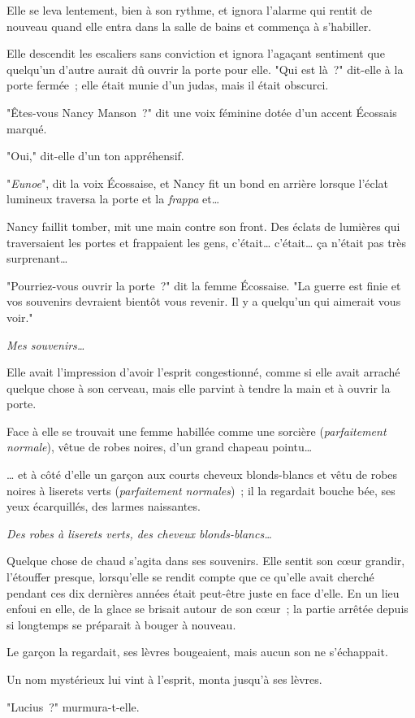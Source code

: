 Elle se leva lentement, bien à son rythme, et ignora l'alarme qui rentit de nouveau quand elle entra dans la salle de bains et commença à s'habiller.

Elle descendit les escaliers sans conviction et ignora l'agaçant sentiment que quelqu'un d'autre aurait dû ouvrir la porte pour elle. "Qui est là~?" dit-elle à la porte fermée~; elle était munie d'un judas, mais il était obscurci.

"Êtes-vous Nancy Manson~?" dit une voix féminine dotée d'un accent Écossais marqué.

"Oui," dit-elle d'un ton appréhensif.

"\emph{Eunoe}", dit la voix Écossaise, et Nancy fit un bond en arrière lorsque l'éclat lumineux traversa la porte et la \emph{frappa} et…

Nancy faillit tomber, mit une main contre son front. Des éclats de lumières qui traversaient les portes et frappaient les gens, c'était… c'était… ça n'était pas très surprenant…

"Pourriez-vous ouvrir la porte~?" dit la femme Écossaise. "La guerre est finie et vos souvenirs devraient bientôt vous revenir. Il y a quelqu'un qui aimerait vous voir."

\emph{Mes souvenirs…}

Elle avait l'impression d'avoir l'esprit congestionné, comme si elle avait arraché quelque chose à son cerveau, mais elle parvint à tendre la main et à ouvrir la porte.

Face à elle se trouvait une femme habillée comme une sorcière (\emph{parfaitement normale}), vêtue de robes noires, d'un grand chapeau pointu…

… et à côté d'elle un garçon aux courts cheveux blonds-blancs et vêtu de robes noires à liserets verts (\emph{parfaitement normales})~; il la regardait bouche bée, ses yeux écarquillés, des larmes naissantes.

\emph{Des robes à liserets verts, des cheveux blonds-blancs…}

Quelque chose de chaud s'agita dans ses souvenirs. Elle sentit son cœur grandir, l'étouffer presque, lorsqu'elle se rendit compte que ce qu'elle avait cherché pendant ces dix dernières années était peut-être juste en face d'elle. En un lieu enfoui en elle, de la glace se brisait autour de son cœur~; la partie arrêtée depuis si longtemps se préparait à bouger à nouveau.

Le garçon la regardait, ses lèvres bougeaient, mais aucun son ne s'échappait.

Un nom mystérieux lui vint à l'esprit, monta jusqu'à ses lèvres.

"Lucius~?" murmura-t-elle.

